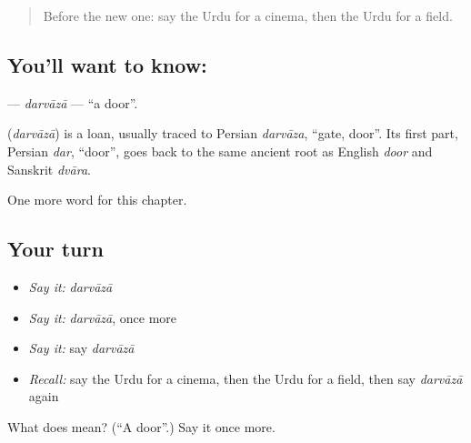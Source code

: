 \label{lesson:UR-C101-darvaza}



\begin{quote}
Before the new one: say the Urdu for a cinema, then the Urdu for a field.
\end{quote}

\subsection*{You'll want to know: }
\textbf{} — \emph{darvāzā} — \textquotedblleft{}a door\textquotedblright{}.

\begin{cousinweb}
\textbf{} (\emph{darvāzā}) is a loan, usually traced to Persian \emph{darvāza}, \textquotedblleft{}gate, door\textquotedblright{}. Its first part, Persian \emph{dar}, \textquotedblleft{}door\textquotedblright{}, goes back to the same ancient root as English \emph{door} and Sanskrit \emph{dvāra}.
\end{cousinweb}

\begin{grammarlens}[title={What you've built}]
One more word for this chapter.
\end{grammarlens}

\subsection*{Your turn}
\begin{itemize}
\raggedright
  \item \emph{Say it:} \emph{darvāzā}
  \item \emph{Say it:} \emph{darvāzā}, once more
  \item \emph{Say it:} say \emph{darvāzā}
  \item \emph{Recall:} say the Urdu for a cinema, then the Urdu for a field, then say \emph{darvāzā} again
\end{itemize}

\begin{tcolorbox}[breakable,colback=teal!4,colframe=teal!35!black,title={Before you move on}]
What does  mean? (\textquotedblleft{}A door\textquotedblright{}.) Say it once more.
\end{tcolorbox}
